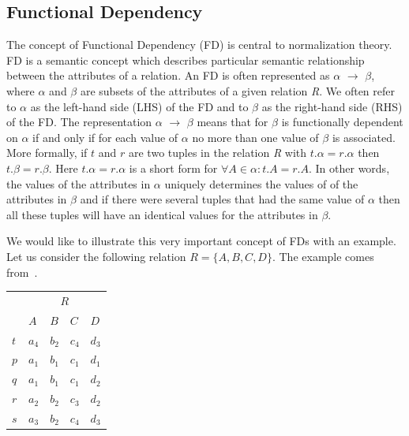\subsection{Functional Dependency}
The concept of Functional Dependency (FD) is central to normalization theory. 
FD is a semantic concept which describes particular semantic relationship 
between the attributes of a relation. An FD is often represented as $\alpha$ $\rightarrow$ $\beta$, 
where $\alpha$ and $\beta$ are subsets of the attributes of a given relation \textit{R}.
We often refer to $\alpha$ as the left-hand side (LHS) of the FD and to $\beta$ as the 
right-hand side (RHS) of the FD.
The representation $\alpha$ $\rightarrow$ $\beta$ means that for $\beta$ is 
functionally dependent on $\alpha$ if and only if 
for each value of $\alpha$ no more than one value of $\beta$ is associated. 
More formally, if $t$ and $r$ are two tuples in the relation \textit{R}
with $t.\alpha = r.\alpha$ then $t.\beta = r.\beta$. Here
$t.\alpha = r.\alpha$ is a short form for 
\begin{math} \forall A \in \alpha : t.A = r.A \end{math}.  
In other words, the values of the attributes  in $\alpha$ uniquely 
determines the values of of the attributes in $\beta$ and 
if there were several tuples that had the same value of $\alpha$ then all these 
tuples will have an identical values for the attributes in $\beta$. 

We would like to illustrate this very important concept of FDs with an example. 
Let us consider the following relation $R = \{A, B, C, D\}$. 
The example comes from~\cite[Section 6.1]{bdb2}.

\begin{center}
\begin{tabular}[h]{l|l|l|l|l|}
  \cline{2-5}
  & \multicolumn{4}{|c|}{$R$} \\ \cline{2-5}
  & $A$ & $B$ & $C$ & $D$ \\ \cline{2-5}
  $t$ & $a_4$ & $b_2$ & $c_4$ & $d_3$ \\ 
  $p$ & $a_1$ & $b_1$ & $c_1$ & $d_1$ \\ 
  $q$ & $a_1$ & $b_1$ & $c_1$ & $d_2$ \\ 
  $r$ & $a_2$ & $b_2$ & $c_3$ & $d_2$ \\ 
  $s$ & $a_3$ & $b_2$ & $c_4$ & $d_3$ \\ \cline{2-5}
\end{tabular}
\end{center}

